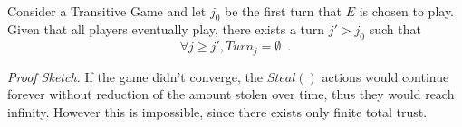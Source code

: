 \documentclass[11pt]{llncs}
\newenvironment{proofsketch}{\textit{Proof Sketch.}}{}
\begin{document}
    \begin{theorem} \ \\
       \label{convergence}
       Consider a Transitive Game and let $j_0$ be the first turn that $E$ is chosen to play. Given that all players
       eventually play, there exists a turn $j' > j_0$ such that
       \begin{equation}
          \forall j \geq j', Turn_j = \emptyset \enspace.
       \end{equation}
    \end{theorem}
    \begin{proofsketch}
       If the game didn't converge, the $Steal\left(\right)$ actions would continue forever without reduction of the amount
       stolen over time, thus they would reach infinity. However this is impossible, since there exists only finite total
       trust.
    \end{proofsketch}
\end{document}
